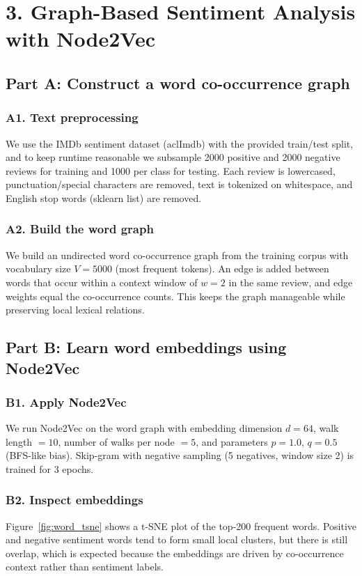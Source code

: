 \documentclass{article}
\begin{document}
\section{3. Graph-Based Sentiment Analysis with Node2Vec}
\subsection{Part A: Construct a word co-occurrence graph}
\subsubsection{A1. Text preprocessing}
We use the IMDb sentiment dataset (aclImdb) with the provided train/test split, and to keep runtime reasonable we subsample 2000 positive and 2000 negative reviews for training and 1000 per class for testing. Each review is lowercased, punctuation/special characters are removed, text is tokenized on whitespace, and English stop words (sklearn list) are removed.
\subsubsection{A2. Build the word graph}
We build an undirected word co-occurrence graph from the training corpus with vocabulary size $V=5000$ (most frequent tokens). An edge is added between words that occur within a context window of $w=2$ in the same review, and edge weights equal the co-occurrence counts. This keeps the graph manageable while preserving local lexical relations.

\subsection{Part B: Learn word embeddings using Node2Vec}
\subsubsection{B1. Apply Node2Vec}
We run Node2Vec on the word graph with embedding dimension $d=64$, walk length $=10$, number of walks per node $=5$, and parameters $p=1.0$, $q=0.5$ (BFS-like bias). Skip-gram with negative sampling (5 negatives, window size 2) is trained for 3 epochs.
\subsubsection{B2. Inspect embeddings}
Figure~\ref{fig:word_tsne} shows a t-SNE plot of the top-200 frequent words. Positive and negative sentiment words tend to form small local clusters, but there is still overlap, which is expected because the embeddings are driven by co-occurrence context rather than sentiment labels.
\end{document}
